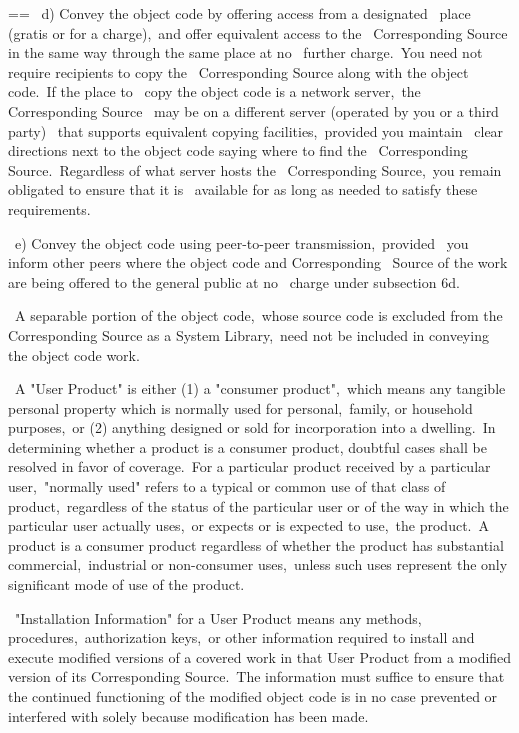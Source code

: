 \documentclass{book}
\makeatletter
\newenvironment{Texinfopreformatted}{%
  \par\GNUTobeylines\obeyspaces\frenchspacing\parskip=\z@\parindent=\z@}{}
{\catcode`\^^M=13 \gdef\GNUTobeylines{\catcode`\^^M=13 \def^^M{\null\par}}}
\newenvironment{Texinfoindented}{\begin{list}{}{}\item\relax}{\end{list}}
\renewcommand{\_}{\Texinfounderscore\discretionary{}{}{}}
\makeatother
\begin{document}
\begin{Texinfoindented}
\begin{Texinfopreformatted}
\    d) Convey the object code by offering access from a designated
\    place (gratis or for a charge),\ and offer equivalent access to the
\    Corresponding Source in the same way through the same place at no
\    further charge.\  You need not require recipients to copy the
\    Corresponding Source along with the object code.\  If the place to
\    copy the object code is a network server,\ the Corresponding Source
\    may be on a different server (operated by you or a third party)
\    that supports equivalent copying facilities,\ provided you maintain
\    clear directions next to the object code saying where to find the
\    Corresponding Source.\  Regardless of what server hosts the
\    Corresponding Source,\ you remain obligated to ensure that it is
\    available for as long as needed to satisfy these requirements.

\    e) Convey the object code using peer-to-peer transmission,\ provided
\    you inform other peers where the object code and Corresponding
\    Source of the work are being offered to the general public at no
\    charge under subsection 6d.

\  A separable portion of the object code,\ whose source code is excluded
from the Corresponding Source as a System Library,\ need not be
included in conveying the object code work.

\  A "User Product" is either (1) a "consumer product",\ which means any
tangible personal property which is normally used for personal,\ family,
or household purposes,\ or (2) anything designed or sold for incorporation
into a dwelling.\  In determining whether a product is a consumer product,
doubtful cases shall be resolved in favor of coverage.\  For a particular
product received by a particular user,\ "normally used" refers to a
typical or common use of that class of product,\ regardless of the status
of the particular user or of the way in which the particular user
actually uses,\ or expects or is expected to use,\ the product.\  A product
is a consumer product regardless of whether the product has substantial
commercial,\ industrial or non-consumer uses,\ unless such uses represent
the only significant mode of use of the product.

\  "Installation Information" for a User Product means any methods,
procedures,\ authorization keys,\ or other information required to install
and execute modified versions of a covered work in that User Product from
a modified version of its Corresponding Source.\  The information must
suffice to ensure that the continued functioning of the modified object
code is in no case prevented or interfered with solely because
modification has been made.


\end{Texinfopreformatted}
\end{Texinfoindented}
\end{document}
